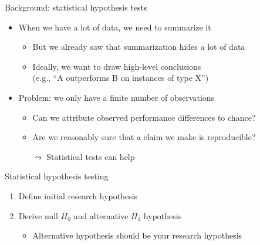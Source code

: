 \begin{frame}[c]{Background: statistical hypothesis tests}

\begin{itemize}
  \item When we have a lot of data, we need to summarize it
  \begin{itemize}
	  \item But we already saw that summarization hides a lot of data
	  \item Ideally, we want to draw high-level conclusions\\
	  (e.g., ``A outperforms B on instances of type X'')
  \end{itemize}

\pause
\bigskip

  \item Problem: we only have a finite number of observations
  \begin{itemize}
	  \item Can we attribute observed performance differences to chance?
	  \item Are we reasonably sure that a claim we make is reproducible?
	  \item[$\leadsto$] Statistical tests can help
  \end{itemize}


\end{itemize}

\medskip

\end{frame}
\begin{frame}[c]{Statistical hypothesis testing}

\begin{enumerate}
  \item Define initial research hypothesis
  \pause
  \item Derive null $H_0$ and alternative $H_1$ hypothesis
  \begin{itemize}
    \item Alternative hypothesis should be your research hypothesis
  \end{itemize}
  \pause
\end{enumerate}	

\end{frame}
